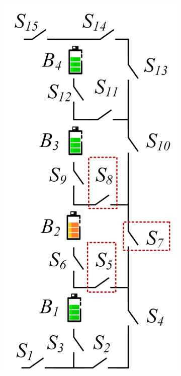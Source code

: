\documentclass{article}
\begin{document}
\begin{figure}[htbp]
   \centering
   \begin{subfigure}[b]{0.2\textwidth}
       \includegraphics[width=\textwidth]{../attachments/arch-e.png}

\end{subfigure}
\end{figure}
\end{document}
